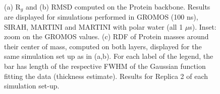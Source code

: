 \begin{figure}[p]
\centering
{} 
 \\
\caption[(SI) Replica 2: Structural measures on buckyball in solution]{(a) R$_g$ and (b) RMSD computed on the Protein backbone. Results are displayed for simulations performed in GROMOS (100 ns), SIRAH, MARTINI and MARTINI with polar water (all 1 $\mu$s). Inset: zoom on the GROMOS values. (c) RDF of Protein masses around their center of mass, computed on both layers, displayed for the same simulation set up as in (a,b). For each label of the legend, the bar has length of the respective FWHM of the Gaussian function fitting the data (thickness estimate). Results for Replica 2 of each simulation set-up.}
\label{fig:struct_UA_SIhere2}
\end{figure}


